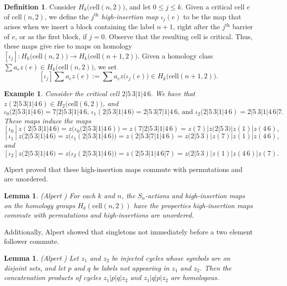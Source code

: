 \documentclass[12py]{amsart}%
\newtheorem{lem}[thm]{Lemma}
\newtheorem{exam}[thm]{Example}
\theoremstyle{definition}\newtheorem{definition}[thm]{Definition}
\theoremstyle{definition}
\newtheorem{defn}[thm]{Definition}
\begin{document}
\begin{defn}
Consider $H_{k}\big(\text{cell}(n,2)\big)$, and let $0\le j\le k$. Given a critical cell $e$ of $\text{cell}(n,2)$, we define the \emph{$j^{\text{th}}$ high-insertion map $\iota_{j}(e)$} to be the map that arises when we insert a block containing the label  $n+1$, right after the $j^{\text{th}}$ barrier of $e$, or as the first block, if $j=0$. Observe that the resulting cell is critical. Thus, these maps give rise to maps on homology $[\iota_{j}]:H_{k}\big(\text{cell}(n,2)\big)\to H_{k}\big(\text{cell}(n+1,2)\big)$. Given a homology class $\sum a_{e}z(e)\in H_{k}\big(\text{cell}(n,2)\big)$, we set 
\[
[\iota_{j}]\sum a_{e}z(e):=\sum a_{e}z\big(\iota_{j}(e)\big)\in H_{k}\big(\text{cell}(n+1,2)\big).
\]
\end{defn}

\begin{exam}
Consider the critical cell $2|5\,3|1|4\,6$. We have that $z(2|5\,3|1|4\,6)\in H_{2}\big(\text{cell}(6,2)\big)$, and 
\[
\iota_{0}(2|5\,3|1|4\,6)=7|2|5\,3|1|4\,6\mbox{,	}\iota_{1}(2|5\,3|1|4\,6)=2|5\,3|7|1|4\,6\mbox{, and }\iota_{2}(2|5\,3|1|4\,6)=2|5\,3|1|4\,6|7.
\]
These maps induce the maps 
\[
[\iota_{0}]z(2|5\,3|1|4\,6)=z\big(\iota_{0}(2|5\,3|1|4\,6)\big)=z(7|2|5\,3|1|4\,6)=z(7)|z(2|5\,3)|z(1)|z(4\,6),
\]
\[
[\iota_{1}]z(2|5\,3|1|4\,6)=z\big(\iota_{1}(2|5\,3|1|4\,6)\big)=z(2|5\,3|7|1|4\,6)=z(2|5\,3)|z(7)|z(1)|z(4\,6),
\]
and 
\[
[\iota_{2}]z(2|5\,3|1|4\,6)=z\big(\iota_{2}(2|5\,3|1|4\,6)\big)=z(2|5\,3|1|4\,6|7)=z(2|5\,3)|z(1)|z(4\,6)|z(7).
\]
\end{exam}

Alpert proved that these high-insertion maps commute with permutations and are unordered.

\begin{lem}
(Alpert \cite[Lemma 6.4]{alpert2020generalized}) For each $k$ and $n$, the $S_{n}$-actions and high-insertion maps on the homology groups $H_{k}(\text{cell}(n,2))$ have the properties high-insertion maps commute with permutations and high-insertions are unordered.
\end{lem}

Additionally, Alpert showed that singletons not immediately before a two element follower commute.

\begin{lem}\label{switchsingles}
(Alpert \cite[Lemma 6.3]{alpert2020generalized}) Let $z_{1}$ and $z_{2}$ be injected cycles whose symbols are on disjoint sets, and let $p$ and $q$ be labels not appearing in $z_{1}$ and $z_{2}$. Then the concatenation products of cycles $z_{1}|p|q|z_{2}$ and $z_{1}|q|p|z_{2}$ are homologous.
\end{lem}
\end{document}
